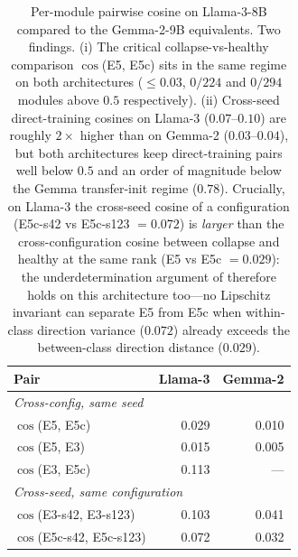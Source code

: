 \documentclass[11pt]{article}
\begin{document}
\begin{table}[h]
\centering
\small
\begin{tabular}{lrr}
\toprule
\textbf{Pair} & \textbf{Llama-3} & \textbf{Gemma-2} \\
\midrule
\multicolumn{3}{l}{\emph{Cross-config, same seed}} \\
$\cos$(E5, E5c)            & 0.029 & 0.010 \\
$\cos$(E5, E3)             & 0.015 & 0.005 \\
$\cos$(E3, E5c)            & 0.113 & --- \\
\midrule
\multicolumn{3}{l}{\emph{Cross-seed, same configuration}} \\
$\cos$(E3-s42, E3-s123)    & 0.103 & 0.041 \\
$\cos$(E5c-s42, E5c-s123)  & 0.072 & 0.032 \\
\bottomrule
\end{tabular}
\caption{Per-module pairwise cosine on Llama-3-8B compared to the Gemma-2-9B equivalents. Two findings. (i) The critical collapse-vs-healthy comparison $\cos$(E5, E5c) sits in the same regime on both architectures ($\leq 0.03$, $0/224$ and $0/294$ modules above $0.5$ respectively). (ii) Cross-seed direct-training cosines on Llama-3 ($0.07$--$0.10$) are roughly $2\times$ higher than on Gemma-2 ($0.03$--$0.04$), but both architectures keep direct-training pairs well below $0.5$ and an order of magnitude below the Gemma transfer-init regime ($0.78$). Crucially, on Llama-3 the cross-seed cosine of a configuration (E5c-s42 vs E5c-s123 $=0.072$) is \emph{larger} than the cross-configuration cosine between collapse and healthy at the same rank (E5 vs E5c $=0.029$): the underdetermination argument of  therefore holds on this architecture too---no Lipschitz invariant can separate E5 from E5c when within-class direction variance ($0.072$) already exceeds the between-class direction distance ($0.029$).}
\label{tab:llama3_cos}
\end{table}
\end{document}

